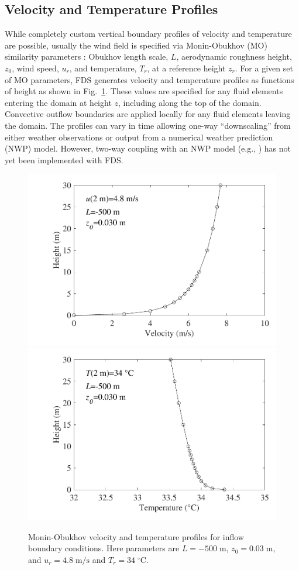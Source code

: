 \documentclass[journal,article,atmosphere,submit,moreauthors,pdftex]{Definitions_Review_Process/mdpi}
\begin{document}
\subsection{Velocity and Temperature Profiles}
\label{sec:veltmpprof}

While completely custom vertical boundary profiles of velocity and temperature are possible, usually the wind field is specified via Monin-Obukhov (MO) similarity parameters \cite{Dyer:1974}: Obukhov length scale, $L$, aerodynamic roughness height, $z_0$, wind speed, $u_r$, and temperature, $T_r$, at a reference height $z_r$.  For a given set of MO parameters, FDS generates velocity and temperature profiles as functions of height as shown in Fig.~\ref{fig:MOprofs}. These values are specified for any fluid elements entering the domain at height $z$, including along the top of the domain.  Convective outflow boundaries are applied locally for any fluid elements leaving the domain.  The profiles can vary in time allowing one-way ``downscaling'' from either weather observations or output from a numerical weather prediction (NWP) model.  However, two-way coupling with an NWP model (e.g., \cite{Coen:2013,CAWFE}) has not yet been implemented with FDS.

\begin{figure}[ht]
\centering
\includegraphics[width=.45\textwidth]{figures/vel_L=-500.pdf}
\includegraphics[width=.45\textwidth]{figures/tmp_L=-500.pdf}
\caption{Monin-Obukhov velocity and temperature profiles for inflow boundary conditions.  Here parameters are $L=-500\;\mathrm{m}$, $z_0=0.03\;\mathrm{m}$, and $u_r=4.8\;\mathrm{m/s}$ and $T_r=34\;^\circ\mathrm{C}$.} 
\label{fig:MOprofs}
\end{figure}
\end{document}
